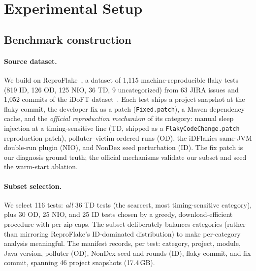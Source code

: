 \section{Experimental Setup}
\label{sec:setup}

\subsection{Benchmark construction}

\paragraph{Source dataset.} We build on ReproFlake~\cite{zhang2026reproflake},
a dataset of 1{,}115 machine-reproducible flaky tests (819 ID, 126 OD, 125
NIO, 36 TD, 9 uncategorized) from 63 JIRA issues and 1{,}052 commits of the
iDoFT dataset~\cite{parry2022survey}. Each test ships a project snapshot at
the flaky commit, the developer fix as a patch (\texttt{Fixed.patch}), a
Maven dependency cache, and the \emph{official reproduction mechanism} of its
category: manual sleep injection at a timing-sensitive line (TD, shipped as
	a \texttt{FlakyCodeChange.patch} reproduction patch), polluter--victim
	ordered runs (OD), the
iDFlakies same-JVM double-run plugin (NIO), and NonDex seed perturbation (ID).
The fix patch is our diagnosis ground truth; the official mechanisms validate
our subset and seed the warm-start ablation.

\paragraph{Subset selection.} We select 116 tests: \emph{all} 36 TD tests
(the scarcest, most timing-sensitive category), plus 30 OD, 25 NIO, and 25 ID
tests chosen by a greedy, download-efficient procedure with per-zip caps. The
subset deliberately balances categories (rather than mirroring ReproFlake's
ID-dominated distribution) to make per-category analysis meaningful. The
manifest records, per test: category, project, module, Java version, polluter
(OD), NonDex seed and rounds (ID), flaky commit, and fix commit, spanning 46
project snapshots (17.4\,GB).

